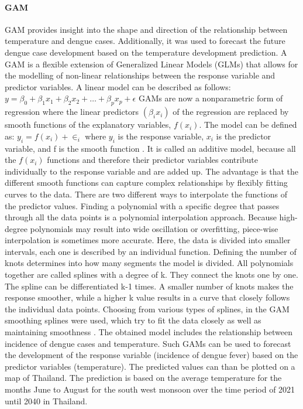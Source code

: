 	
	\paragraph{GAM}
	GAM provides insight into the shape and direction of the relationship between temperature and dengue cases. Additionally, it was used to forecast the future dengue case development based on the temperature development prediction. 
	A GAM is a flexible extension of Generalized Linear Models (GLMs) that allows for the modelling of non-linear relationships between the response variable and predictor variables. A linear model can be described as follows:
	$y=\beta _0+\beta _1 x_1+\beta _2 x_2 +…+\beta _p x_p+\epsilon$
	GAMs are now a nonparametric form of regression where the linear predictors $(\beta_i x_i)$ of the regression are replaced by smooth functions of the explanatory variables, $f(x_i)$. The model can be defined as:
	$y_i=f(x_i )+\in_i$
	where $y_i$ is the response variable, $x_i$ is the predictor variable, and f is the smooth function \citep{Wood2006}.
	It is called an additive model, because all the $f(x_i)$ functions and therefore their predictor variables contribute individually to the response variable and are added up. The advantage is that the different smooth functions can capture complex relationships by flexibly fitting curves to the data.
	There are two different ways to interpolate the functions of the predictor values. Finding a polynomial with a specific degree that passes through all the data points is a polynomial interpolation approach. Because high-degree polynomials may result into wide oscillation or overfitting, piece-wise interpolation is sometimes more accurate. Here, the data is divided into smaller intervals, each one is described by an individual function. Defining the number of knots determines into how many segments the model is divided. All polynomials together are called splines with a degree of k. They connect the knots one by one. The spline can be differentiated k-1 times. A smaller number of knots makes the response smoother, while a higher k value results in a curve that closely follows the individual data points. Choosing from various types of splines, in the GAM smoothing splines were used, which try to fit the data closely as well as maintaining smoothness \citep{Peri2021}.
	The obtained model includes the relationship between incidence of dengue cases and temperature. Such GAMs can be used to forecast the development of the response variable (incidence of dengue fever) based on the predictor variables (temperature). The predicted values can than be plotted on a map of Thailand. The prediction is based on the average temperature for the months June to August for the south west monsoon over the time period of 2021 until 2040 in Thailand.
	
